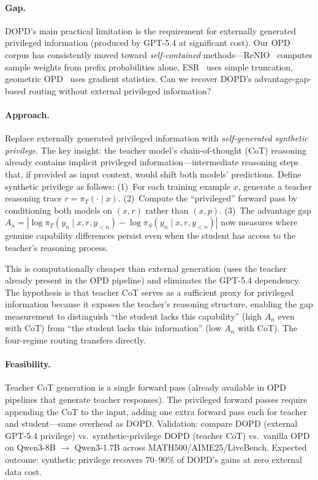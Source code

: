 \documentclass[11pt,a4paper]{article}
\begin{document}
\paragraph{Gap.} DOPD's main practical limitation is the requirement for externally generated privileged information (produced by GPT-5.4 at significant cost). Our OPD corpus has consistently moved toward \emph{self-contained} methods---ReNIO~\cite{lin2026renio} computes sample weights from prefix probabilities alone, ESR~\cite{wang2026esr} uses simple truncation, geometric OPD~\cite{shen2026geometry} uses gradient statistics. Can we recover DOPD's advantage-gap-based routing without external privileged information?

\paragraph{Approach.} Replace externally generated privileged information with \emph{self-generated synthetic privilege}. The key insight: the teacher model's chain-of-thought (CoT) reasoning already contains implicit privileged information---intermediate reasoning steps that, if provided as input context, would shift both models' predictions. Define synthetic privilege as follows: (1)~For each training example $x$, generate a teacher reasoning trace $r = \pi_T(\cdot \mid x)$. (2)~Compute the ``privileged'' forward pass by conditioning both models on $(x, r)$ rather than $(x, p)$. (3)~The advantage gap $A_n = |\log \pi_T(y_n \mid x, r, y_{<n}) - \log \pi_S(y_n \mid x, r, y_{<n})|$ now measures where genuine capability differences persist even when the student has access to the teacher's reasoning process.

This is computationally cheaper than external generation (uses the teacher already present in the OPD pipeline) and eliminates the GPT-5.4 dependency. The hypothesis is that teacher CoT serves as a sufficient proxy for privileged information because it exposes the teacher's reasoning structure, enabling the gap measurement to distinguish ``the student lacks this capability'' (high $A_n$ even with CoT) from ``the student lacks this information'' (low $A_n$ with CoT). The four-regime routing transfers directly.

\paragraph{Feasibility.} Teacher CoT generation is a single forward pass (already available in OPD pipelines that generate teacher responses). The privileged forward passes require appending the CoT to the input, adding one extra forward pass each for teacher and student---same overhead as DOPD. Validation: compare DOPD (external GPT-5.4 privilege) vs.\ synthetic-privilege DOPD (teacher CoT) vs.\ vanilla OPD on Qwen3-8B $\to$ Qwen3-1.7B across MATH500/AIME25/LiveBench. Expected outcome: synthetic privilege recovers 70--90\% of DOPD's gains at zero external data cost.
\end{document}
